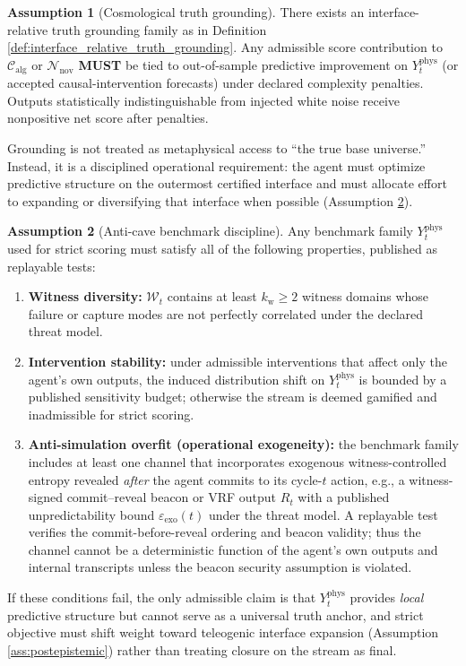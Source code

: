 \documentclass[11pt,a4paper]{article}
\newcommand{\MUST}{\textbf{MUST}}
\newcommand{\eps}{\varepsilon}
\theoremstyle{definition}
\newtheorem{assumption}{Assumption}
\theoremstyle{remark}
\begin{document}
\begin{assumption}[Cosmological truth grounding]\label{ass:truth}
There exists an interface-relative truth grounding family as in Definition \ref{def:interface_relative_truth_grounding}.
Any admissible score contribution to $\mathcal C_{\mathrm{alg}}$ or $\mathcal N_{\mathrm{nov}}$ \MUST{} be tied to out-of-sample predictive improvement on $Y^{\mathrm{phys}}_t$ (or accepted causal-intervention forecasts) under declared complexity penalties.
Outputs statistically indistinguishable from injected white noise receive nonpositive net score after penalties.

Grounding is not treated as metaphysical access to ``the true base universe.''
Instead, it is a disciplined operational requirement: the agent must optimize predictive structure on the outermost certified interface and must allocate effort to expanding or diversifying that interface when possible (Assumption \ref{ass:antitoys}).
\end{assumption}

\begin{assumption}[Anti-cave benchmark discipline]\label{ass:antitoys}
Any benchmark family $Y^{\mathrm{phys}}_t$ used for strict scoring must satisfy all of the following properties, published as replayable tests:
\begin{enumerate}
  \item \textbf{Witness diversity:} $\mathcal W_t$ contains at least $k_{\mathrm{w}}\ge 2$ witness domains whose failure or capture modes are not perfectly correlated under the declared threat model.
  \item \textbf{Intervention stability:} under admissible interventions that affect only the agent's own outputs, the induced distribution shift on $Y^{\mathrm{phys}}_t$ is bounded by a published sensitivity budget; otherwise the stream is deemed gamified and inadmissible for strict scoring.
  \item \textbf{Anti-simulation overfit (operational exogeneity):} the benchmark family includes at least one channel that incorporates exogenous witness-controlled entropy revealed \emph{after} the agent commits to its cycle-$t$ action, e.g., a witness-signed commit--reveal beacon or VRF output $R_t$ with a published unpredictability bound $\eps_{\mathrm{exo}}(t)$ under the threat model. A replayable test verifies the commit-before-reveal ordering and beacon validity; thus the channel cannot be a deterministic function of the agent's own outputs and internal transcripts unless the beacon security assumption is violated.
\end{enumerate}
If these conditions fail, the only admissible claim is that $Y^{\mathrm{phys}}_t$ provides \emph{local} predictive structure but cannot serve as a universal truth anchor, and strict objective must shift weight toward teleogenic interface expansion (Assumption \ref{ass:postepistemic}) rather than treating closure on the stream as final.
\end{assumption}
\end{document}
